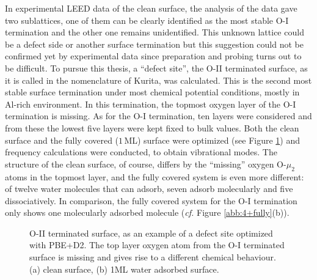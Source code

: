 \documentclass[11pt,DIV=13,BCOR=5mm,a4paper,headinclude]{scrbook}
\begin{document}
In experimental LEED data of the clean surface, the analysis of the data gave two sublattices, one of them can be clearly identified as the most stable O-I termination and the other one remains unidentified.
This unknown lattice could be a defect side or another surface termination but this suggestion could not be confirmed yet by experimental data since preparation and probing turns out to be difficult.
To pursue this thesis, a ``defect site'', the O-II terminated surface, as it is called in the nomenclature of Kurita\cite{kuri10}, was calculated.
This is the second most stable surface termination under most chemical potential conditions, mostly in Al-rich environment.
In this termination, the topmost oxygen layer of the O-I termination is missing.
As for the O-I termination, ten layers were considered and from these the lowest five layers were kept fixed to bulk values.
Both the clean surface and the fully covered ($1\,$ML) surface were optimized (see Figure \ref{abb:O-II-geom}) and frequency calculations were conducted, to obtain vibrational modes.
The structure of the clean surface, of course, differs by the ``missing'' oxygen O-$\mu_2$ atoms in the topmost layer, and the fully covered system is even more different: of twelve water molecules that can adsorb, seven adsorb molecularly and five dissociatively.
In comparison, the fully covered system for the O-I termination only shows one molecularly adsorbed molecule (\textit{cf.} Figure \ref{abb:4+fully}(b)).
 \begin{figure}[!ht]
 \centering
{}
 \quad\quad
 \caption{O-II terminated surface, as an example of a defect site optimized with PBE+D2.
The top layer oxygen atom from the O-I terminated surface is missing and gives rise to a different chemical behaviour.
(a) clean surface, (b) 1ML water adsorbed surface.}
        \label{abb:O-II-geom}
 \end{figure}
\end{document}
